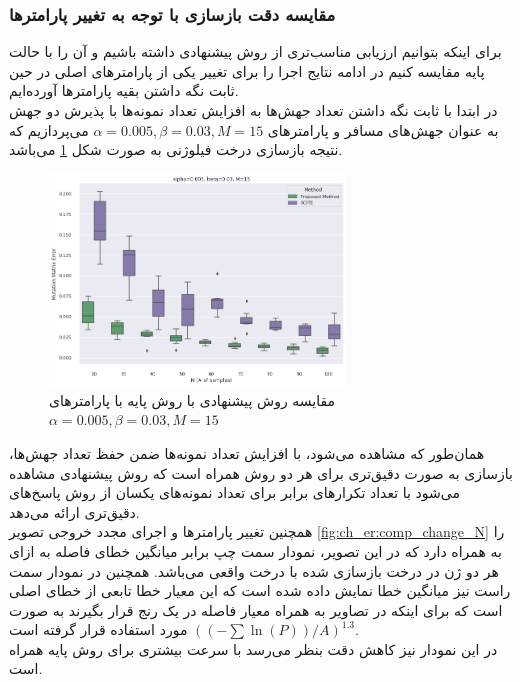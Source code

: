 \subsubsection{مقایسه دقت بازسازی با توجه به تغییر پارامترها}
برای اینکه بتوانیم ارزیابی مناسب‌تری از روش پیشنهادی داشته باشیم و آن را با حالت پایه مقایسه کنیم در ادامه نتایج اجرا را برای تغییر یکی از پارامترهای اصلی در حین ثابت نگه داشتن بقیه پارامترها آورده‌ایم.\\
در ابتدا با ثابت نگه داشتن تعداد جهش‌ها به افزایش تعداد نمونه‌ها با پذیرش دو جهش به عنوان جهش‌های مسافر و پارامترهای
$\alpha=0.005, \beta=0.03, M=15$
می‌پردازیم که نتیجه بازسازی درخت فیلوژنی به صورت شکل \ref{fig:sy_n_err_mean} می‌باشد.
\begin{figure}[!ht]
	\centering
	\includegraphics[width=0.7\textwidth]{img/chaps/er/comp_pm_scite}
	\caption{‌مقایسه روش پیشنهادی با روش پایه  با پارامترهای $\alpha=0.005, \beta=0.03, M=15$}
	\label{fig:sy_n_err_mean}
\end{figure}
همان‌طور که مشاهده می‌شود، با افزایش تعداد نمونه‌ها ضمن حفظ تعداد جهش‌ها، بازسازی به صورت ‌دقیق‌تری برای هر دو روش همراه است که روش پیشنهادی مشاهده می‌شود با تعداد تکرارهای برابر برای تعداد نمونه‌های یکسان از روش  پاسخ‌های دقیق‌تری ارائه می‌دهد.\\
همچنین تغییر پارامترها و اجرای مجدد خروجی تصویر \ref{fig:ch_er:comp_change_N} را به همراه دارد که در این تصویر، نمودار سمت چپ برابر میانگین خطای فاصله به ازای هر دو ژن در درخت بازسازی شده با درخت واقعی می‌باشد. همچنین در نمودار سمت راست نیز میانگین خطا نمایش داده شده است که این معیار خطا تابعی از خطای اصلی است که برای اینکه در تصاویر به همراه معیار فاصله در یک رنج قرار بگیرند به صورت  
$\left(\left( -\sum\ln(P)\right)/A\right)^{1.3}$ مورد استفاده قرار گرفته است.
\\ در این نمودار نیز کاهش دقت بنظر می‌رسد با سرعت بیشتری برای روش پایه همراه است.
